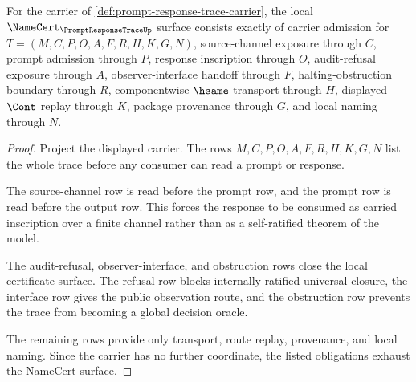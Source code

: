 \begin{theorem}
\label{thm:prompt-response-trace-namecert-obligations}
For the carrier of \autoref{def:prompt-response-trace-carrier}, the local $\NameCert_{\PromptResponseTraceUp}$ surface consists exactly of carrier admission for $T=(M,C,P,O,A,F,R,H,K,G,N)$, source-channel exposure through $C$, prompt admission through $P$, response inscription through $O$, audit-refusal exposure through $A$, observer-interface handoff through $F$, halting-obstruction boundary through $R$, componentwise $\hsame$ transport through $H$, displayed $\Cont$ replay through $K$, package provenance through $G$, and local naming through $N$.
\end{theorem}
\begin{proof}
Project the displayed carrier. The rows $M,C,P,O,A,F,R,H,K,G,N$ list the whole trace before any consumer can read a prompt or response.

The source-channel row is read before the prompt row, and the prompt row is read before the output row. This forces the response to be consumed as carried inscription over a finite channel rather than as a self-ratified theorem of the model.

The audit-refusal, observer-interface, and obstruction rows close the local certificate surface. The refusal row blocks internally ratified universal closure, the interface row gives the public observation route, and the obstruction row prevents the trace from becoming a global decision oracle.

The remaining rows provide only transport, route replay, provenance, and local naming. Since the carrier has no further coordinate, the listed obligations exhaust the NameCert surface.
\end{proof}

